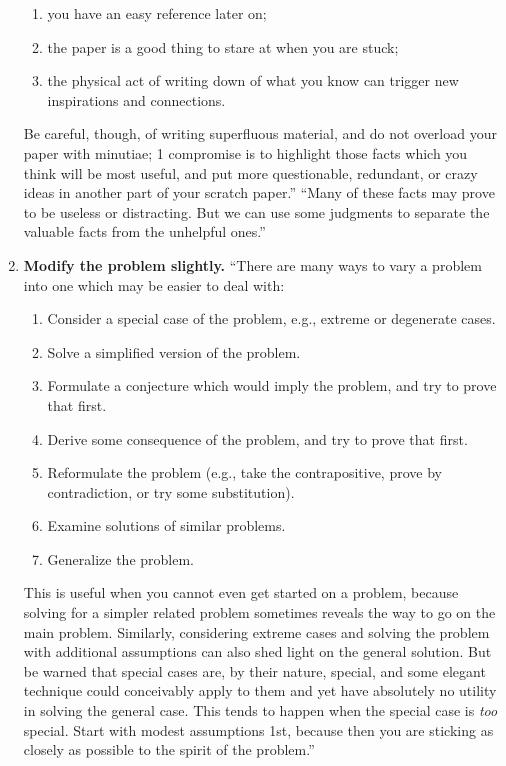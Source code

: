 \documentclass[oneside]{book}
\numberwithin{equation}{section}
\begin{document}
\begin{enumerate}
\begin{enumerate}
		\item you have an easy reference later on;
		\item the paper is a good thing to stare at when you are stuck;
		\item the physical act of writing down of what you know can trigger new inspirations and connections.
	\end{enumerate}
	Be careful, though, of writing superfluous material, and do not overload your paper with minutiae; 1 compromise is to highlight those facts which you think will be most useful, and put more questionable, redundant, or crazy ideas in another part of your scratch paper.'' ``Many of these facts may prove to be useless or distracting. But we can use some judgments to separate the valuable facts from the unhelpful ones.''
	\item \textbf{Modify the problem slightly.} ``There are many ways to vary a problem into one which may be easier to deal with:
	\begin{enumerate}
		\item Consider a special case of the problem, e.g., extreme or degenerate cases.
		\item Solve a simplified version of the problem.
		\item Formulate a conjecture which would imply the problem, and try to prove that first.
		\item Derive some consequence of the problem, and try to prove that first.
		\item Reformulate the problem (e.g., take the contrapositive, prove by contradiction, or try some substitution).
		\item Examine solutions of similar problems.
		\item Generalize the problem.
	\end{enumerate}
	This is useful when you cannot even get started on a problem, because solving for a simpler related problem sometimes reveals the way to go on the main problem. Similarly, considering extreme cases and solving the problem with additional assumptions can also shed light on the general solution. But be warned that special cases are, by their nature, special, and some elegant technique could conceivably apply to them and yet have absolutely no utility in solving the general case. This tends to happen when the special case is \textit{too} special. Start with modest assumptions 1st, because then you are sticking as closely as possible to the spirit of the problem.''

\end{enumerate}
\end{document}
